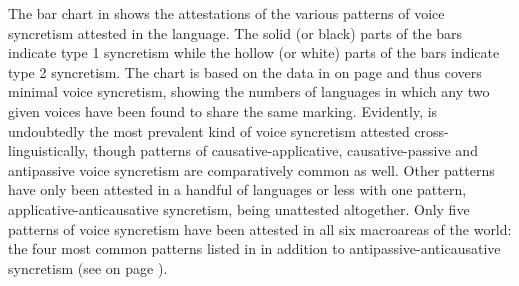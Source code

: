 The bar chart in  shows the attestations of the various patterns of voice syncretism attested in the language. The solid (or black) parts of the bars indicate type 1 syncretism while the hollow (or white) parts of the bars indicate type 2 syncretism. The chart is based on the data in  on page \pageref{tab:ch6:voice-syncretism-simplex} and thus covers minimal voice syncretism, showing the numbers of languages in which any two given voices have been found to share the same marking. Evidently,  is undoubtedly the most prevalent kind of voice syncretism attested cross-linguistically, though patterns of causative-applicative, causative-passive and antipassive voice syncretism are comparatively common as well. Other patterns have only been attested in a handful of languages or less with one pattern, applicative-anticausative syncretism, being unattested altogether. Only five patterns of voice syncretism have been attested in all six macroareas of the world: the four most common patterns listed in  in addition to antipassive-anticausative syncretism (see  on page \pageref{tab:ch6:voice-syncretism-macroarea-minimal}).

